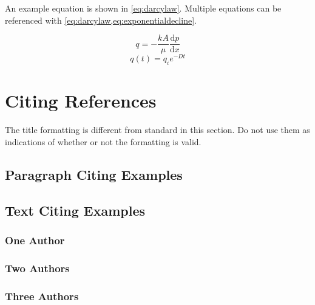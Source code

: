 \documentclass[conference]{spe}
\begin{document}
An example equation is shown in \cref{eq:darcylaw}. Multiple equations can be referenced with \cref{eq:darcylaw,eq:exponentialdecline}.

\begin{equation}
    q = -\frac{kA}{\mu}\frac{\mathrm{d}p}{\mathrm{d}x}
    \label{eq:darcylaw}
\end{equation}
\begin{equation}
    q(t) = q_i e^{-Dt}
    \label{eq:exponentialdecline}
\end{equation}

\section{Citing References}
The title formatting is different from standard in this section. Do not use them as indications of whether or not the formatting is valid.

\subsection{Paragraph Citing Examples}
\noindent{}\parencite{ref:balasubramanian2016a, ref:brett1989b, ref:ledgerwood2013a}
\par{}\noindent{}\parencite{ref:brett1992a, ref:pavone1994a, ref:mowat2001a}

\subsection{Text Citing Examples}

\subsubsection{One Author}\mbox{}
\par{}\noindent{}\textcite{ref:brett1992a}

\subsubsection{Two Authors}\mbox{}
\par{}\noindent{}\textcite{ref:pavone1994a}

\subsubsection{Three Authors}\mbox{}
\par{}\noindent{}\textcite{ref:brett1989b}
\par{}\noindent{}\textcite{ref:mowat2001a}

\nocite{ref:ahmad2014a}
\nocite{ref:almahrooqi2011a}
\nocite{ref:alsaeedi2008a}
\nocite{ref:balasubramanian2016a}
\nocite{ref:boualleg2024a}
\nocite{ref:brett1989b}
\nocite{ref:brett1992a}
\nocite{ref:chunsheng2024a}
\nocite{ref:gingerich1999a}
\nocite{ref:ledgerwood2010a}
\nocite{ref:ledgerwood2013a}
\nocite{ref:mason2007a}
\nocite{ref:mowat2001a}
\nocite{ref:pastorek2019a}
\nocite{ref:pavone1994a}
\nocite{ref:robson1993a}
\nocite{ref:yan2019a}
\nocite{ref:wang2025a}
\nocite{ref:wang2026a}
\nocite{ref:wu2020a}
\nocite{ref:xinming2014a}
\nocite{ref:zhang2025a}
\nocite{ref:zheng2017a}

\printbibliography{}
\end{document}

